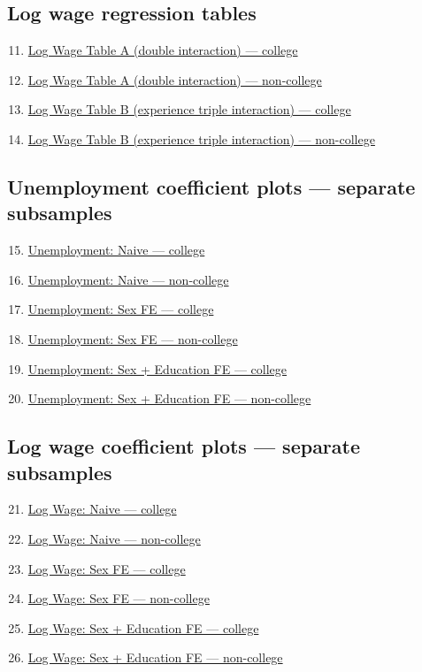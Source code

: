 \documentclass[11pt]{article}
\begin{document}
\subsection*{Log wage regression tables}
\begin{enumerate}\setcounter{enumi}{10}
  \item \hyperref[tab:lw_A_col]{Log Wage Table A (double interaction) --- college}
  \item \hyperref[tab:lw_A_noncol]{Log Wage Table A (double interaction) --- non-college}
  \item \hyperref[tab:lw_B_col]{Log Wage Table B (experience triple interaction) --- college}
  \item \hyperref[tab:lw_B_noncol]{Log Wage Table B (experience triple interaction) --- non-college}
\end{enumerate}

\subsection*{Unemployment coefficient plots --- separate subsamples}
\begin{enumerate}\setcounter{enumi}{14}
  \item \hyperref[fig:unemp_naive_col]{Unemployment: Naive --- college}
  \item \hyperref[fig:unemp_naive_noncol]{Unemployment: Naive --- non-college}
  \item \hyperref[fig:unemp_sexFE_col]{Unemployment: Sex FE --- college}
  \item \hyperref[fig:unemp_sexFE_noncol]{Unemployment: Sex FE --- non-college}
  \item \hyperref[fig:unemp_sexeducFE_col]{Unemployment: Sex + Education FE --- college}
  \item \hyperref[fig:unemp_sexeducFE_noncol]{Unemployment: Sex + Education FE --- non-college}
\end{enumerate}

\subsection*{Log wage coefficient plots --- separate subsamples}
\begin{enumerate}\setcounter{enumi}{20}
  \item \hyperref[fig:lw_naive_col]{Log Wage: Naive --- college}
  \item \hyperref[fig:lw_naive_noncol]{Log Wage: Naive --- non-college}
  \item \hyperref[fig:lw_sexFE_col]{Log Wage: Sex FE --- college}
  \item \hyperref[fig:lw_sexFE_noncol]{Log Wage: Sex FE --- non-college}
  \item \hyperref[fig:lw_sexeducFE_col]{Log Wage: Sex + Education FE --- college}
  \item \hyperref[fig:lw_sexeducFE_noncol]{Log Wage: Sex + Education FE --- non-college}
\end{enumerate}
\end{document}

